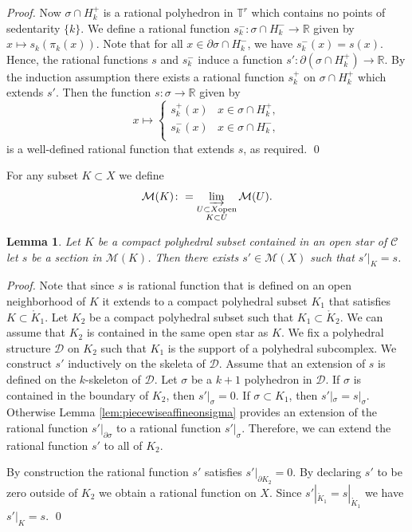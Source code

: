 \documentclass[11pt]{article}
\numberwithin{equation}{numsection}
\newcommand{\CC}{{\mathcal C}}
\newcommand{\R}{{\mathbb R}}
\newcommand{\TT}{{\mathbb T}}
\newcommand{\DS}{\mathcal{D}}
\newcommand{\MS}{\mathcal{M}}
\newtheorem{lemma}[thm]{Lemma}
\begin{document}
\begin{proof}
Now $\sigma \cap H_k^+$ is a rational polyhedron in $\TT^r$ which contains no points of sedentarity $\{k\}$. 
We define a rational function 
$s_k^- \colon \sigma \cap H_k^- \to \R$ given by $x \mapsto s_k(\pi_k(x))$.
Note that for all $x \in \partial \sigma \cap H_k^-$, we have $s_k^-(x) = s(x)$.
Hence, the rational functions $s$ and $s_k^-$ induce a function $s' \colon \partial (\sigma \cap H_k^+) \to \R$. 
By the induction assumption there exists a rational function $s_k^+$ on $\sigma \cap H_k^+$ which extends $s'$.
Then the function $s : \sigma \to \R$ given by 
\[
  x \mapsto 
		\begin{cases} 
		  s_k^+(x) & x \in \sigma \cap H_k^+, \\
		  s_k^-(x) & x \in \sigma \cap H_k^-, \\
		\end{cases}
\]
is a well-defined rational function that extends $s$, as required. 
\qed
\end{proof}



For any subset $K \subset X$  we define $$\mathcal{M}(K) \colon = \varinjlim_{\substack{U \subset X \text{open} \\ K \subset U}} \mathcal{M}(U).$$


\begin{lemma} \label{pc softness}
	Let $K$ be a compact polyhedral subset contained in an open star of $\CC$ let $s$ be a section in $\MS(K)$. 
	Then there exists $s' \in \MS(X)$ such that $s' |_K = s$.  
\end{lemma}

\begin{proof}
Note that since $s$ is rational function that is defined on an open neighborhood of $K$ 
it extends to a compact polyhedral subset $K_1$ that satisfies $K \subset \mathring K_1$. 
Let $K_2$ be a compact polyhedral subset such that $K_1 \subset \mathring K_2$. 
We can assume that $K_2$ is contained in the same open star as $K$.
We fix a polyhedral structure $\DS$ on $K_2$ such that $K_1$ is the 
support of a polyhedral subcomplex.  
We construct $s'$ inductively on the skeleta of $\DS$. 
Assume that an extension of $s$ is defined on the $k$-skeleton of $\DS$. 
Let $\sigma$ be a $k+1$ polyhedron in $\DS$. 
If $\sigma$ is contained in the boundary of $K_2$, then $s'|_{\sigma} = 0$.
If $\sigma \subset K_1$, then $s'|_{\sigma} = s|_{\sigma}$. 
Otherwise  Lemma \ref{lem:piecewiseaffineonsigma}  provides an extension of the rational function $s'|_{\partial \sigma}$ to  a rational function $s'|_{\sigma}$.   
Therefore, we can extend the rational function $s'$ to all of $K_2$. 

By construction the rational function $s'$ satisfies $s'|_{\partial K_2} = 0$.
By declaring $s'$ to be zero outside of $K_2$ we obtain a rational function on $X$.  
Since $s'|_{\mathring K_1} = s|_{\mathring K_1}$ we have $s'|_K = s$.  
\qed
\end{proof}
\end{document}
